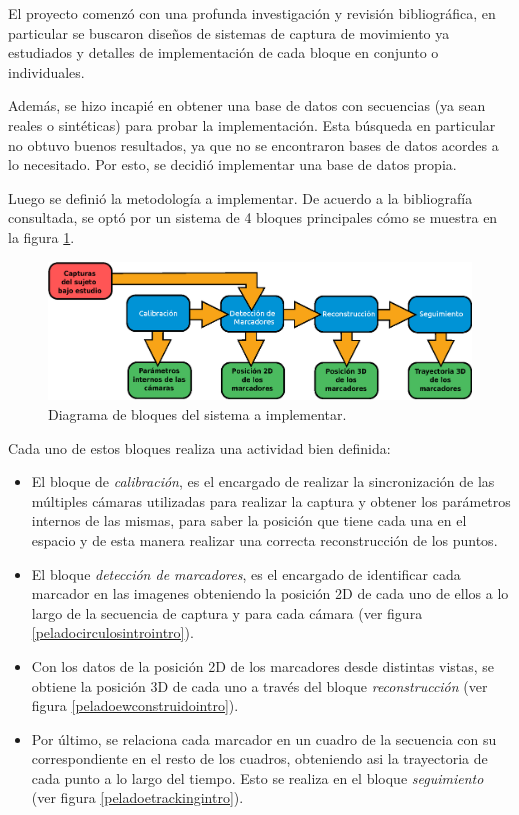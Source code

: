 El proyecto comenzó con una profunda investigación y revisión bibliográfica, en particular se buscaron diseños de sistemas de captura de movimiento ya estudiados y detalles de implementación de cada bloque en conjunto o individuales. 

Además, se hizo incapié en obtener una base de datos con secuencias (ya sean reales o sintéticas) para probar la implementación. Esta búsqueda en particular no obtuvo buenos resultados, ya que no se encontraron bases de datos acordes a lo necesitado. Por esto, se decidió implementar una base de datos propia.

 Luego se definió la metodología a implementar. De acuerdo a la bibliografía consultada, se optó por un sistema de 4 bloques principales cómo se muestra en la figura \ref{bloquesSistintro}. 

 \begin{figure}[H]
\begin{center}
\includegraphics[scale=0.8]{img/Sistema_completo/Diagrama_de_bloques.eps}
\end{center}
\caption{Diagrama de bloques del sistema a implementar.}
\label{bloquesSistintro}
\end{figure}

Cada uno de estos bloques realiza una actividad bien definida:
\begin{itemize}
\item El bloque de \emph{calibración}, es el encargado de realizar la sincronización de las múltiples cámaras utilizadas para realizar la captura y obtener los parámetros internos de las mismas, para saber la posición que tiene cada una en el espacio y de esta manera realizar una correcta reconstrucción de los puntos.
\item El bloque \emph{detección de marcadores}, es el encargado de identificar cada marcador en las imagenes obteniendo la posición 2D de cada uno de ellos a lo largo de la secuencia de captura y para cada cámara (ver figura \ref{peladocirculosintrointro}).
\item Con los datos de la posición 2D de los marcadores desde distintas vistas, se obtiene la posición 3D de cada uno a través del bloque \emph{reconstrucción} (ver figura \ref{peladoewconstruidointro}).
\item Por último, se relaciona cada marcador en un cuadro de la secuencia con su correspondiente en el resto de los cuadros, obteniendo asi la trayectoria de cada punto a lo largo del tiempo. Esto se realiza en el bloque \emph{seguimiento} (ver figura \ref{peladoetrackingintro}).
\end{itemize}

